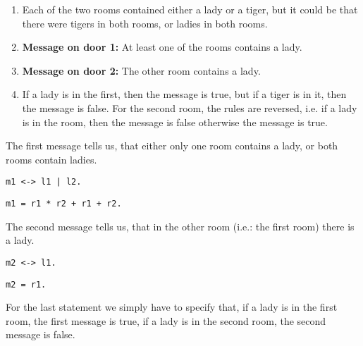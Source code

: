 \begin{enumerate}

\item Each of the two rooms contained either a lady or a tiger, but it could be that there were tigers in both rooms, or ladies in both rooms.

\item \textbf{Message on door 1:} At least one of the rooms contains a lady.

\item \textbf{Message on door 2:} The other room contains a lady.


\item If a lady is in the first, then the message is true, but if a tiger is in it, then the message is false. For the second room, the rules are reversed, i.e. if a lady is in the room, then the message is false otherwise the message is true.

\end{enumerate}


The first message tells us, that either only one room contains a lady, or both rooms contain ladies.


\begin{multicols}{2}
\begin{lstlisting}[numbers=none,title=Propositional logic]
m1 <-> l1 | l2.
\end{lstlisting}

\begin{lstlisting}[numbers=none,title=Modular arithmetics]
m1 = r1 * r2 + r1 + r2.
\end{lstlisting}

\end{multicols}


The second message tells us, that in the other room (i.e.: the first room) there is a lady.

\begin{multicols}{2}

\begin{lstlisting}[numbers=none,title=Propositional logic]
m2 <-> l1.
\end{lstlisting}

\begin{lstlisting}[numbers=none,title=Modular arithmetics]
m2 = r1.
\end{lstlisting}

\end{multicols}

For the last statement we simply have to specify that, if a lady is in the first room, the first message is true, if a lady is in the second room, the second message is false.

